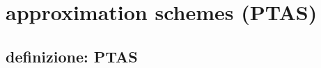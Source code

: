 \section*{approximation schemes (PTAS)}


\subsection*{definizione: PTAS}
\begin{flushleft}
	\begin{itemize}
	\end{itemize}
\end{flushleft}


\newpage
